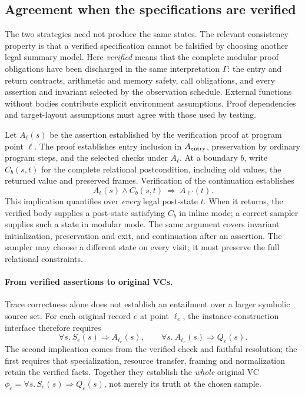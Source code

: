 \subsection{Agreement when the specifications are verified}
\label{supp:verified-specification-testing}
The two strategies need not produce the same states. The relevant consistency
property is that a verified specification cannot be falsified by choosing
another legal summary model. Here \emph{verified} means that the complete
modular proof obligations have been discharged in the same interpretation
$\Gamma$: the entry and return contracts, arithmetic and memory safety,
call obligations, and every assertion and invariant selected by the
observation schedule. External functions without bodies contribute explicit
environment assumptions. Proof dependencies and target-layout assumptions
must agree with those used by testing.

Let $A_\ell(s)$ be the assertion established by the verification proof at
program point $\ell$. The proof establishes entry inclusion in $A_{\rm entry}$,
preservation by ordinary program steps, and the selected checks under
$A_\ell$. At a boundary $b$, write $C_b(s,t)$ for the complete relational
postcondition, including old values, the returned value and preserved frames.
Verification of the continuation establishes
\[
 A_\ell(s)\land C_b(s,t)\ \Longrightarrow\ A_{\ell'}(t).
\]
This implication quantifies over \emph{every} legal post-state $t$.
When it returns, the verified body supplies a post-state satisfying $C_b$
in inline mode;
a correct sampler supplies such a state in modular mode.
The same argument covers invariant initialization, preservation and exit,
and continuation after an assertion. The sampler may choose a different
state on every visit; it must preserve the full relational constraints.

\paragraph{From verified assertions to original VCs.}
Trace correctness alone does not establish an entailment over a larger
symbolic source set. For each original record $e$ at point $\ell_e$, the
instance-construction interface therefore requires
\[
  \forall s.\ S_e(s)\Rightarrow A_{\ell_e}(s),
  \qquad
  \forall s.\ A_{\ell_e}(s)\Rightarrow Q_e(s).
\]
The second implication comes from the verified check and faithful resolution;
the first requires that specialization, resource transfer, framing and
normalization retain the verified facts. Together they establish the
\emph{whole} original VC $\phi_e=\forall s.\,S_e(s)\Rightarrow Q_e(s)$,
not merely its truth at the chosen sample.


